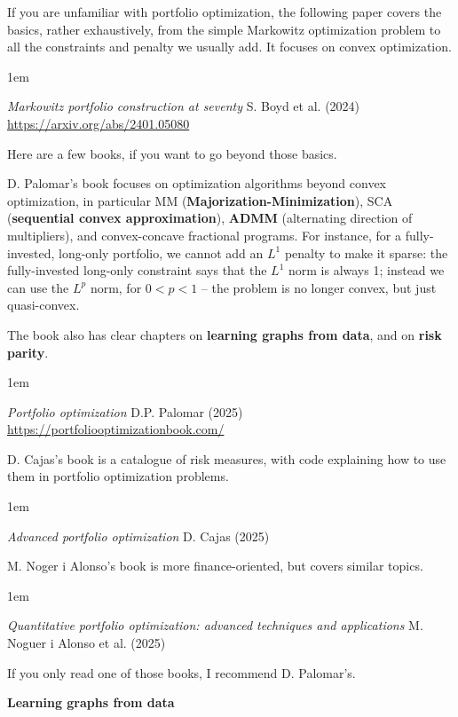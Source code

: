 \documentclass[a5paper]{article}
\let\d\textbf
\newenvironment{reference}{%
  \medskip\goodbreak
  \parskip 0pt
  \raggedright
  \leftskip 1em
  \obeylines
}{\par\medskip\goodbreak}
\def\subsection#1{{\par\bigskip\goodbreak\large\bfseries #1\par}}
\begin{document}
If you are unfamiliar with portfolio optimization, the following paper covers the basics,
rather exhaustively, from the simple Markowitz optimization problem
to all the constraints and penalty we usually add. It focuses on convex optimization.

\begin{reference}
  \emph{Markowitz portfolio construction at seventy}
  S. Boyd et al. (2024)
  \url{https://arxiv.org/abs/2401.05080}
\end{reference}

Here are a few books, if you want to go beyond those basics.

D. Palomar's book focuses on optimization algorithms beyond convex optimization, in particular
MM (\d{Majorization-Minimization}), SCA (\d{sequential convex approximation}),
\d{ADMM} (alternating direction of multipliers), and convex-concave fractional programs.
For instance, for a fully-invested, long-only portfolio,
we cannot add an $L^1$ penalty to make it sparse:
the fully-invested long-only constraint says that the $L^1$ norm is always 1;
instead we can use the $L^p$ norm, for $0<p<1$ -- the problem is no longer convex, but just quasi-convex.

The book also has clear chapters on \d{learning graphs from data},
and on \d{risk parity}.

\begin{reference}
  \emph{Portfolio optimization}
  D.P. Palomar (2025)
  \url{https://portfoliooptimizationbook.com/}
\end{reference}

D. Cajas's book is a catalogue of risk measures,
with code explaining how to use them in portfolio optimization problems.

\begin{reference}
  \emph{Advanced portfolio optimization}
  D. Cajas (2025)
\end{reference}

M. Noger i Alonso's book is more finance-oriented,
but covers similar topics.

\begin{reference}
  \emph{Quantitative portfolio optimization: advanced techniques and applications}
  M. Noguer i Alonso et al. (2025)
\end{reference}

If you only read one of those books, I recommend D. Palomar's.

\subsection{Learning graphs from data}
\end{document}
